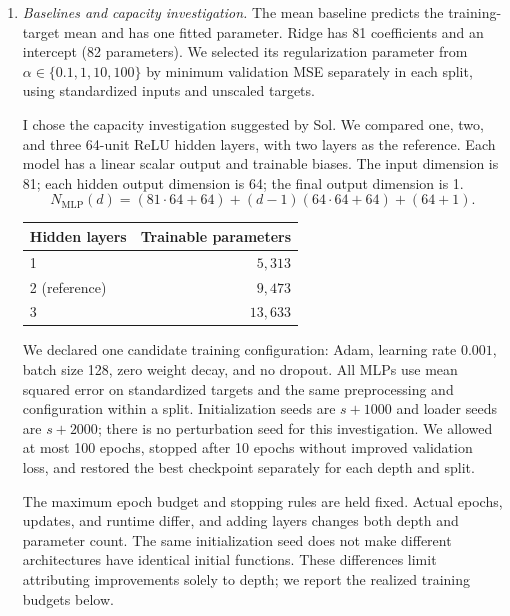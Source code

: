 \documentclass[12pt]{article}
\begin{document}
\begin{enumerate}
\begin{enumerate}[label=\textbf{\Alph*.}, leftmargin=*]
       \item \emph{Baselines and capacity investigation.}
       The mean baseline predicts the training-target mean and has one
       fitted parameter. Ridge has 81 coefficients and an intercept
       (82 parameters). We selected its regularization parameter from
       $\alpha\in\{0.1,1,10,100\}$ by minimum validation MSE separately
       in each split, using standardized inputs and unscaled targets.

       I chose the capacity investigation suggested by Sol. We compared
       one, two, and three 64-unit ReLU hidden layers, with two layers
       as the reference. Each model has a linear scalar output and
       trainable biases. The input dimension is 81; each hidden output
       dimension is 64; the final output dimension is 1.
       \[
           N_{\mathrm{MLP}}(d)
           =(81\cdot64+64)+(d-1)(64\cdot64+64)+(64+1).
       \]
       \begin{center}
       \begin{tabular}{l r}
           \toprule
           Hidden layers & Trainable parameters \\
           \midrule
           1 & $5{,}313$ \\
           2 (reference) & $9{,}473$ \\
           3 & $13{,}633$ \\
           \bottomrule
       \end{tabular}
       \end{center}
       We declared one candidate training configuration: Adam,
       learning rate $0.001$, batch size 128, zero weight decay, and
       no dropout. All MLPs use mean squared error on standardized
       targets and the same preprocessing and configuration within a
       split. Initialization seeds are $s+1000$ and loader seeds are
       $s+2000$; there is no perturbation seed for this investigation.
       We allowed at most 100 epochs, stopped after 10 epochs without
       improved validation loss, and restored the best checkpoint
       separately for each depth and split.

       The maximum epoch budget and stopping rules are held fixed.
       Actual epochs, updates, and runtime differ, and adding layers
       changes both depth and parameter count. The same initialization
       seed does not make different architectures have identical initial
       functions. These differences limit attributing improvements
       solely to depth; we report the realized training budgets below.


\end{enumerate}
\end{enumerate}
\end{document}
